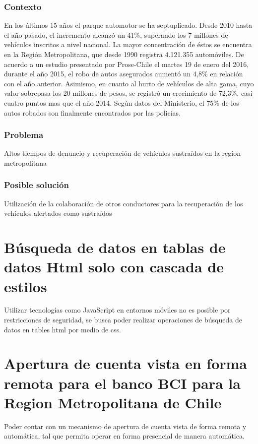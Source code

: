 \documentclass[12pt,letterpaper]{article}
\begin{document}
\subsubsection{Contexto}
En los últimos 15 años el parque automotor se ha septuplicado. Desde 2010 hasta el año pasado, el incremento alcanzó un 41\%, superando los 7 millones de vehículos inscritos a nivel nacional\autocite{crecimiento}.
La mayor concentración de éstos se encuentra en la Región Metropolitana, que desde 1990 registra 4.121.355 automóviles.
De acuerdo a un estudio presentado por Prose-Chile\autocite{robos_2015} el martes 19 de enero del 2016, durante el año 2015, el robo de autos asegurados aumentó un 4,8\% en relación con el año anterior. Asimismo, en cuanto al hurto de vehículos de alta gama, cuyo valor sobrepasa los 20 millones de pesos, se registró un crecimiento de 72,3\%, casi cuatro puntos mas que el año 2014.
Según datos del Ministerio, el 75\% de los autos robados son finalmente encontrados por las policías.

\subsubsection{Problema}
Altos tiempos de denuncio y recuperación de vehículos sustraídos en la region metropolitana

\subsubsection{Posible solución}
Utilización de la colaboración de otros conductores para la recuperación de los vehículos alertados como sustraídos


\section{Búsqueda de datos en tablas de datos Html solo con cascada de estilos}

Utilizar tecnologías como JavaScript en entornos móviles no es posible por restricciones de seguridad, se busca poder realizar operaciones de búsqueda de datos en tables html por medio de css.



\section{Apertura de cuenta vista en forma remota para el banco BCI para la Region Metropolitana de Chile }

Poder contar con un mecanismo de apertura de cuenta vista de forma remota y automática, tal que permita operar en forma presencial de manera automática.
\end{document}
